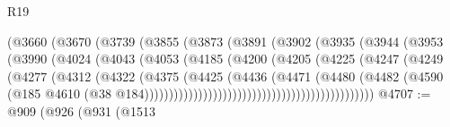 \begin{lexlean}{R19}
\begin{coremodule}
{{{{{{{{{{{                                  (@3660
                                    (@3670
                                      (@3739
                                        (@3855
                                          (@3873
                                            (@3891
                                              (@3902
                                                (@3935
                                                  (@3944
                                                    (@3953
                                                      (@3990
                                                        (@4024
                                                          (@4043
                                                            (@4053
                                                              (@4185
                                                                (@4200
                                                                  (@4205
                                                                    (@4225
                                                                      (@4247
                                                                        (@4249
                                                                          (@4277
                                                                            (@4312
                                                                              (@4322
                                                                                (@4375
                                                                                  (@4425
                                                                                    (@4436
                                                                                      (@4471
                                                                                        (@4480
                                                                                          (@4482
                                                                                            (@4590
                                                                                              (@185
                                                                                                @4610
                                                                                                (@38
                                                                                                  @184)))))))))))))))))))))))))))))))))))))))))))))))
@4707 := @909
    (@926
      (@931
        (@1513
}}}}}}}}}}}
\end{coremodule}
\end{lexlean}
